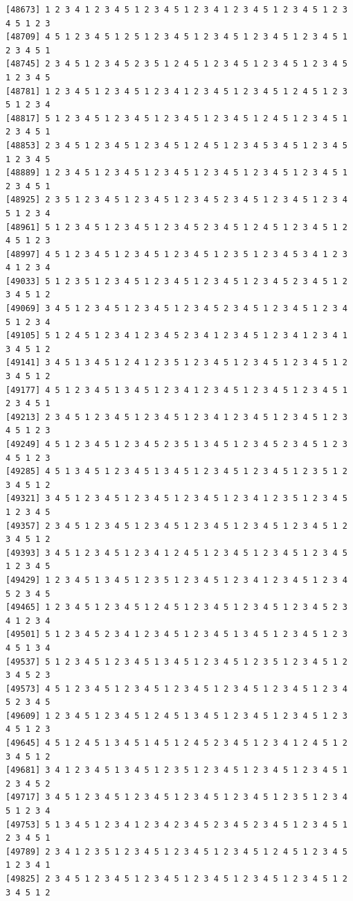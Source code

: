 \documentclass[
  english,
]{book}
\begin{document}
\begin{verbatim}
[48673] 1 2 3 4 1 2 3 4 5 1 2 3 4 5 1 2 3 4 1 2 3 4 5 1 2 3 4 5 1 2 3 4 5 1 2 3
[48709] 4 5 1 2 3 4 5 1 2 5 1 2 3 4 5 1 2 3 4 5 1 2 3 4 5 1 2 3 4 5 1 2 3 4 5 1
[48745] 2 3 4 5 1 2 3 4 5 2 3 5 1 2 4 5 1 2 3 4 5 1 2 3 4 5 1 2 3 4 5 1 2 3 4 5
[48781] 1 2 3 4 5 1 2 3 4 5 1 2 3 4 1 2 3 4 5 1 2 3 4 5 1 2 4 5 1 2 3 5 1 2 3 4
[48817] 5 1 2 3 4 5 1 2 3 4 5 1 2 3 4 5 1 2 3 4 5 1 2 4 5 1 2 3 4 5 1 2 3 4 5 1
[48853] 2 3 4 5 1 2 3 4 5 1 2 3 4 5 1 2 4 5 1 2 3 4 5 3 4 5 1 2 3 4 5 1 2 3 4 5
[48889] 1 2 3 4 5 1 2 3 4 5 1 2 3 4 5 1 2 3 4 5 1 2 3 4 5 1 2 3 4 5 1 2 3 4 5 1
[48925] 2 3 5 1 2 3 4 5 1 2 3 4 5 1 2 3 4 5 2 3 4 5 1 2 3 4 5 1 2 3 4 5 1 2 3 4
[48961] 5 1 2 3 4 5 1 2 3 4 5 1 2 3 4 5 2 3 4 5 1 2 4 5 1 2 3 4 5 1 2 4 5 1 2 3
[48997] 4 5 1 2 3 4 5 1 2 3 4 5 1 2 3 4 5 1 2 3 5 1 2 3 4 5 3 4 1 2 3 4 1 2 3 4
[49033] 5 1 2 3 5 1 2 3 4 5 1 2 3 4 5 1 2 3 4 5 1 2 3 4 5 2 3 4 5 1 2 3 4 5 1 2
[49069] 3 4 5 1 2 3 4 5 1 2 3 4 5 1 2 3 4 5 2 3 4 5 1 2 3 4 5 1 2 3 4 5 1 2 3 4
[49105] 5 1 2 4 5 1 2 3 4 1 2 3 4 5 2 3 4 1 2 3 4 5 1 2 3 4 1 2 3 4 1 3 4 5 1 2
[49141] 3 4 5 1 3 4 5 1 2 4 1 2 3 5 1 2 3 4 5 1 2 3 4 5 1 2 3 4 5 1 2 3 4 5 1 2
[49177] 4 5 1 2 3 4 5 1 3 4 5 1 2 3 4 1 2 3 4 5 1 2 3 4 5 1 2 3 4 5 1 2 3 4 5 1
[49213] 2 3 4 5 1 2 3 4 5 1 2 3 4 5 1 2 3 4 1 2 3 4 5 1 2 3 4 5 1 2 3 4 5 1 2 3
[49249] 4 5 1 2 3 4 5 1 2 3 4 5 2 3 5 1 3 4 5 1 2 3 4 5 2 3 4 5 1 2 3 4 5 1 2 3
[49285] 4 5 1 3 4 5 1 2 3 4 5 1 3 4 5 1 2 3 4 5 1 2 3 4 5 1 2 3 5 1 2 3 4 5 1 2
[49321] 3 4 5 1 2 3 4 5 1 2 3 4 5 1 2 3 4 5 1 2 3 4 1 2 3 5 1 2 3 4 5 1 2 3 4 5
[49357] 2 3 4 5 1 2 3 4 5 1 2 3 4 5 1 2 3 4 5 1 2 3 4 5 1 2 3 4 5 1 2 3 4 5 1 2
[49393] 3 4 5 1 2 3 4 5 1 2 3 4 1 2 4 5 1 2 3 4 5 1 2 3 4 5 1 2 3 4 5 1 2 3 4 5
[49429] 1 2 3 4 5 1 3 4 5 1 2 3 5 1 2 3 4 5 1 2 3 4 1 2 3 4 5 1 2 3 4 5 2 3 4 5
[49465] 1 2 3 4 5 1 2 3 4 5 1 2 4 5 1 2 3 4 5 1 2 3 4 5 1 2 3 4 5 2 3 4 1 2 3 4
[49501] 5 1 2 3 4 5 2 3 4 1 2 3 4 5 1 2 3 4 5 1 3 4 5 1 2 3 4 5 1 2 3 4 5 1 3 4
[49537] 5 1 2 3 4 5 1 2 3 4 5 1 3 4 5 1 2 3 4 5 1 2 3 5 1 2 3 4 5 1 2 3 4 5 2 3
[49573] 4 5 1 2 3 4 5 1 2 3 4 5 1 2 3 4 5 1 2 3 4 5 1 2 3 4 5 1 2 3 4 5 2 3 4 5
[49609] 1 2 3 4 5 1 2 3 4 5 1 2 4 5 1 3 4 5 1 2 3 4 5 1 2 3 4 5 1 2 3 4 5 1 2 3
[49645] 4 5 1 2 4 5 1 3 4 5 1 4 5 1 2 4 5 2 3 4 5 1 2 3 4 1 2 4 5 1 2 3 4 5 1 2
[49681] 3 4 1 2 3 4 5 1 3 4 5 1 2 3 5 1 2 3 4 5 1 2 3 4 5 1 2 3 4 5 1 2 3 4 5 2
[49717] 3 4 5 1 2 3 4 5 1 2 3 4 5 1 2 3 4 5 1 2 3 4 5 1 2 3 5 1 2 3 4 5 1 2 3 4
[49753] 5 1 3 4 5 1 2 3 4 1 2 3 4 2 3 4 5 2 3 4 5 2 3 4 5 1 2 3 4 5 1 2 3 4 5 1
[49789] 2 3 4 1 2 3 5 1 2 3 4 5 1 2 3 4 5 1 2 3 4 5 1 2 4 5 1 2 3 4 5 1 2 3 4 1
[49825] 2 3 4 5 1 2 3 4 5 1 2 3 4 5 1 2 3 4 5 1 2 3 4 5 1 2 3 4 5 1 2 3 4 5 1 2

\end{verbatim}
\end{document}
